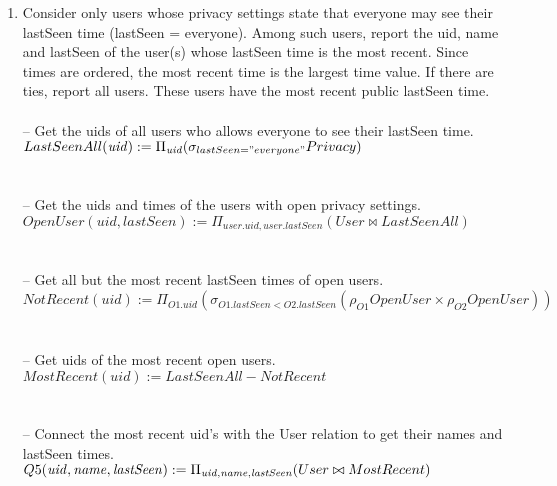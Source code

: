 \documentclass{article}
\newcommand{\var}[1]{\mathit{#1}}
\begin{document}
\begin{enumerate}
\item   %
Consider only users whose privacy settings state that everyone may see their lastSeen time (lastSeen = everyone). Among such users, report the uid, name and lastSeen of the user(s) whose lastSeen time is the most recent. Since times are ordered, the most recent time is the largest time value. If there are ties, report all users. These users have the most recent public lastSeen time. \\\\ [5pt]
{\large
\hspace*{1cm} -- Get the uids of all users who allows everyone to see their lastSeen time. \\ [5pt]
$
LastSeenAll(\var{uid}) :=
	\Pi_{\var{\var{uid}}}
	(\sigma_{lastSeen = "everyone"} Privacy)
$ \\\\\\
\hspace*{1cm} -- Get the uids and times of the users with open privacy settings. \\ [5pt]
$
OpenUser(uid, lastSeen) := 
	\Pi_{user.uid, user.lastSeen}
	(User \bowtie LastSeenAll)
$\\\\\\
\hspace*{1cm} -- Get all but the most recent lastSeen times of open users. \\ [5pt]
$
NotRecent(\var{uid}) := \Pi_{\var{O1.uid}}
	(\sigma_{O1.\var{lastSeen} < O2.\var{lastSeen}}
	(\rho_{O1}OpenUser \times \rho_{O2}OpenUser))
$\\\\\\
\hspace*{1cm} -- Get uids of the most recent open users. \\ [5pt]
$
MostRecent(\var{uid}) := LastSeenAll - NotRecent
$\\\\\\
\hspace*{1cm} -- Connect the most recent uid's with the User relation to get their names and \hspace*{1cm} lastSeen times. \\ [5pt]
$
Q5(\var{uid}, \var{name}, \var{lastSeen}) := 
	\Pi_{\var{uid}, \var{name}, \var{lastSeen}} 
	(User \bowtie MostRecent) \\ 
$
}


\end{enumerate}
\end{document}
